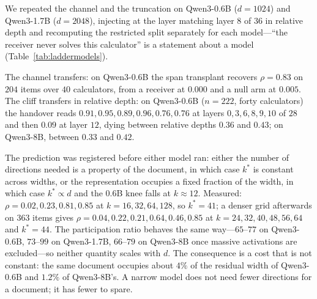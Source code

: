 \documentclass{article}
\begin{document}
We repeated the channel and the truncation on Qwen3-0.6B ($d=1024$) and
Qwen3-1.7B ($d=2048$), injecting at the layer matching layer $8$ of $36$ in
relative depth and recomputing the restricted split separately for each
model---``the receiver never solves this calculator'' is a statement about a
model (Table~\ref{tab:laddermodels}).

The channel transfers: on Qwen3-0.6B the span transplant recovers
$\rho = 0.83$ on $204$ items over $40$ calculators, from a receiver at $0.000$
and a null arm at $0.005$. The cliff transfers in relative depth: on Qwen3-0.6B
($n=222$, forty calculators) the handover reads
$0.91, 0.95, 0.89, 0.96, 0.76, 0.76$ at layers $0,3,6,8,9,10$ of $28$ and then
$0.09$ at layer $12$, dying between relative depths $0.36$ and $0.43$; on
Qwen3-8B, between $0.33$ and $0.42$.

The prediction was registered before either model ran: either the number of
directions needed is a property of the document, in which case $k^{*}$ is
constant across widths, or the representation occupies a fixed fraction of the
width, in which case $k^{*}\propto d$ and the $0.6$B knee falls at $k\approx12$.
Measured: $\rho = 0.02, 0.23, 0.81, 0.85$ at $k = 16, 32, 64, 128$, so
$k^{*}=41$; a denser grid afterwards on $363$ items gives
$\rho = 0.04, 0.22, 0.21, 0.64, 0.46, 0.85$ at $k = 24,32,40,48,56,64$ and
$k^{*}=44$. The participation ratio behaves the same way---$65$--$77$ on
Qwen3-0.6B, $73$--$99$ on Qwen3-1.7B, $66$--$79$ on Qwen3-8B once massive
activations are excluded---so neither quantity scales with $d$. The consequence
is a cost that is not constant: the same document occupies about $4\%$ of the
residual width of Qwen3-0.6B and $1.2\%$ of Qwen3-8B's. A narrow model does not
need fewer directions for a document; it has fewer to spare.

\begin{table}[t]
\caption{The channel and the truncation curve at three model widths, each with
its own restricted split and its own injection layer at matched relative depth.
$\rho$ is Eq.~\ref{eq:rho}; \emph{gold} is what the document itself is worth on
that model's restricted items, which is why the $0.6$B and $1.7$B rows have low
absolute accuracy and a large $n$: those models solve almost nothing without the
document, so almost every item qualifies. The knee of the truncation curve sits
between $k=32$ and $k=64$ at $d=1024$ and at $d=4096$ alike; a width-proportional
account predicts $k\approx12$ for the first.}
\label{tab:laddermodels}
\centering
\footnotesize
\setlength{\tabcolsep}{3pt}

\end{table}
\end{document}
